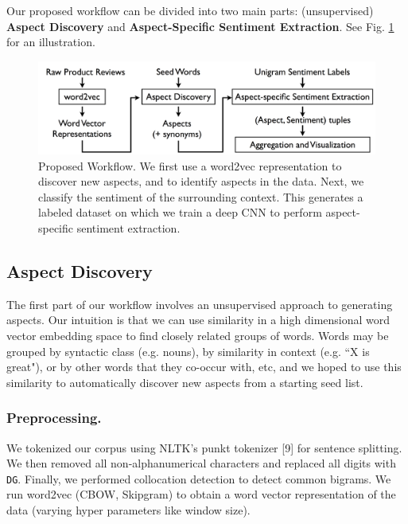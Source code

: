 \documentclass{article} %
\begin{document}
Our proposed workflow can be divided into two main parts: (unsupervised) {\bf Aspect Discovery} and {\bf Aspect-Specific Sentiment Extraction}. See Fig. \ref{workflow} for an illustration.


\begin{figure}[ht]
\begin{center}
\includegraphics[width=.85\columnwidth]{workflow.png}
\end{center}
\caption{Proposed Workflow. We first use a word2vec representation to discover new aspects, and to identify aspects in the data. Next, we classify the sentiment of the surrounding context. This generates a labeled dataset on which we train a deep CNN to perform aspect-specific sentiment extraction.}%
\label{workflow}
\end{figure}


\subsection{Aspect Discovery}

The first part of our workflow involves an unsupervised approach to generating aspects. Our intuition is that we can use similarity in a high dimensional word vector embedding space to find closely related groups of words. Words may be grouped by syntactic class (e.g. nouns), by similarity in context (e.g. ``X is great"), or by other words that they co-occur with, etc, and we hoped to use this similarity to automatically discover new aspects from a starting seed list.

\subsubsection{Preprocessing.} We tokenized our corpus using NLTK's punkt tokenizer [9] for sentence splitting. We then removed all non-alphanumerical characters and replaced all digits with \texttt{DG}. Finally, we performed collocation detection to detect common bigrams. We run word2vec (CBOW, Skipgram) to obtain a word vector representation of the data (varying hyper parameters like window size). 
\end{document}
